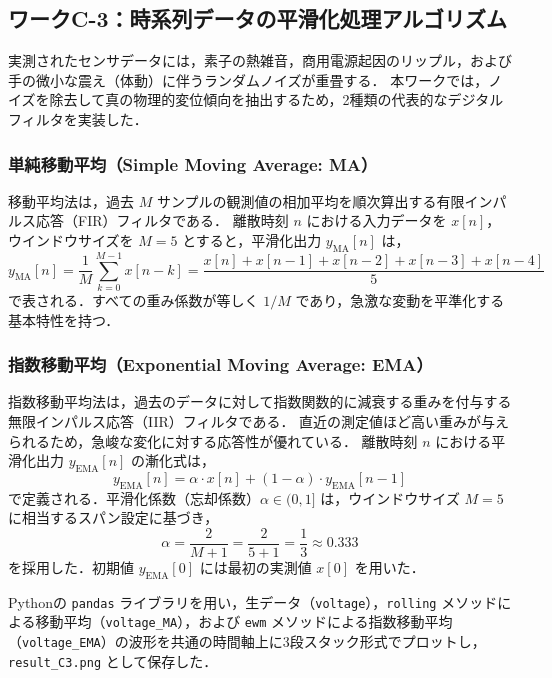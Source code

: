 \subsection{ワークC-3：時系列データの平滑化処理アルゴリズム}

実測されたセンサデータには，素子の熱雑音，商用電源起因のリップル，および手の微小な震え（体動）に伴うランダムノイズが重畳する．
本ワークでは，ノイズを除去して真の物理的変位傾向を抽出するため，2種類の代表的なデジタルフィルタを実装した．

\subsubsection{単純移動平均（Simple Moving Average: MA）}
移動平均法は，過去 $M$ サンプルの観測値の相加平均を順次算出する有限インパルス応答（FIR）フィルタである\cite{smith1997scientist}．
離散時刻 $n$ における入力データを $x[n]$，ウインドウサイズを $M = 5$ とすると，平滑化出力 $y_{\mathrm{MA}}[n]$ は，
\begin{equation}
    y_{\mathrm{MA}}[n] = \frac{1}{M} \sum_{k=0}^{M-1} x[n-k] = \frac{x[n] + x[n-1] + x[n-2] + x[n-3] + x[n-4]}{5}
    \label{eq:ma_def}
\end{equation}
で表される．すべての重み係数が等しく $1/M$ であり，急激な変動を平準化する基本特性を持つ．

\subsubsection{指数移動平均（Exponential Moving Average: EMA）}
指数移動平均法は，過去のデータに対して指数関数的に減衰する重みを付与する無限インパルス応答（IIR）フィルタである\cite{oppenheim2009discrete}．
直近の測定値ほど高い重みが与えられるため，急峻な変化に対する応答性が優れている．
離散時刻 $n$ における平滑化出力 $y_{\mathrm{EMA}}[n]$ の漸化式は，
\begin{equation}
    y_{\mathrm{EMA}}[n] = \alpha \cdot x[n] + (1 - \alpha) \cdot y_{\mathrm{EMA}}[n-1]
    \label{eq:ema_def}
\end{equation}
で定義される．平滑化係数（忘却係数）$\alpha \in (0, 1]$ は，ウインドウサイズ $M = 5$ に相当するスパン設定に基づき，
\begin{equation}
    \alpha = \frac{2}{M + 1} = \frac{2}{5 + 1} = \frac{1}{3} \approx 0.333
    \label{eq:ema_alpha}
\end{equation}
を採用した．初期値 $y_{\mathrm{EMA}}[0]$ には最初の実測値 $x[0]$ を用いた．

Pythonの \texttt{pandas} ライブラリを用い，生データ（\texttt{voltage}），\texttt{rolling} メソッド\cite{pandas_rolling}による移動平均（\texttt{voltage\_MA}），および \texttt{ewm} メソッド\cite{pandas_ewm}による指数移動平均（\texttt{voltage\_EMA}）の波形を共通の時間軸上に3段スタック形式でプロットし，\texttt{result\_C3.png} として保存した．


